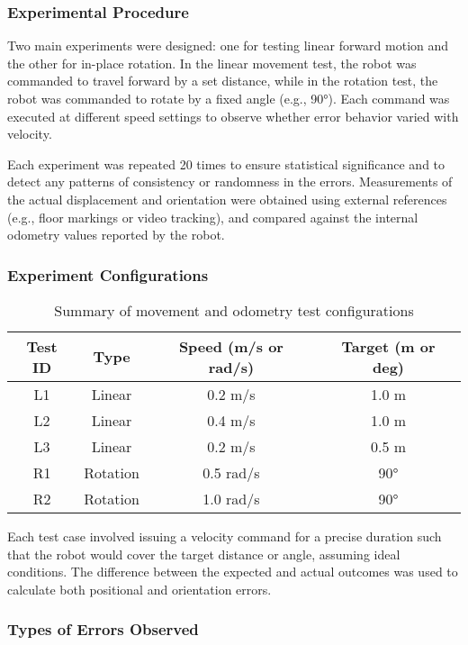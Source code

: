 \documentclass[a4paper, 12pt]{article}
\begin{document}
    \subsubsection*{Experimental Procedure}

    Two main experiments were designed: one for testing linear forward motion and the other for in-place rotation. In the linear movement test, the robot was commanded to travel forward by a set distance, while in the rotation test, the robot was commanded to rotate by a fixed angle (e.g., 90°). Each command was executed at different speed settings to observe whether error behavior varied with velocity.

    Each experiment was repeated 20 times to ensure statistical significance and to detect any patterns of consistency or randomness in the errors. Measurements of the actual displacement and orientation were obtained using external references (e.g., floor markings or video tracking), and compared against the internal odometry values reported by the robot.

    \subsubsection*{Experiment Configurations}

    \begin{table}[H]
    \centering
    \begin{tabular}{|c|c|c|c|}
    \hline
    \textbf{Test ID} & \textbf{Type} & \textbf{Speed (m/s or rad/s)} & \textbf{Target (m or deg)} \\
    \hline
    L1 & Linear & 0.2 m/s & 1.0 m \\
    L2 & Linear & 0.4 m/s & 1.0 m \\
    L3 & Linear & 0.2 m/s & 0.5 m \\
    R1 & Rotation & 0.5 rad/s & 90° \\
    R2 & Rotation & 1.0 rad/s & 90° \\
    \hline
    \end{tabular}
    \caption{Summary of movement and odometry test configurations}
    \end{table}

    Each test case involved issuing a velocity command for a precise duration such that the robot would cover the target distance or angle, assuming ideal conditions. The difference between the expected and actual outcomes was used to calculate both positional and orientation errors.

    \subsubsection*{Types of Errors Observed}
\end{document}
